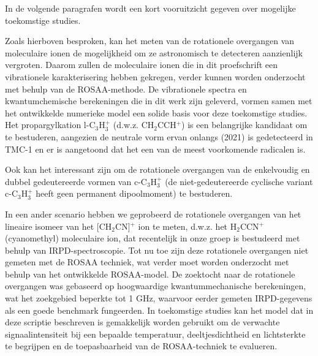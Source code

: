 {In de volgende paragrafen wordt een kort vooruitzicht gegeven over mogelijke toekomstige studies.

Zoals hierboven besproken, kan het meten van de rotationele overgangen van moleculaire ionen de mogelijkheid om ze 
astronomisch te detecteren aanzienlijk vergroten. Daarom zullen de moleculaire ionen die in dit proefschrift een 
vibrationele karakterisering hebben gekregen, verder kunnen worden onderzocht met behulp van de ROSAA-methode. De 
vibrationele spectra en kwantumchemische berekeningen die in dit werk zijn geleverd, vormen samen met het ontwikkelde 
numerieke model een solide basis voor deze toekomstige studies. Het propargylkation l-C$_3$H$_3^+$ (d.w.z. CH$_2$CCH$^+$) is een belangrijke kandidaat om te bestuderen, aangezien de neutrale vorm ervan onlangs (2021) is gedetecteerd in TMC-1 en er is aangetoond dat het een van de meest voorkomende radicalen is.

Ook kan het interessant zijn om de rotationele overgangen van de enkelvoudig en dubbel gedeutereerde vormen van c-C$_3$H$_3^+$ (de niet-gedeutereerde cyclische variant c-C$_3$H$_3^+$ heeft geen permanent dipoolmoment) te bestuderen. 

In een ander scenario hebben we geprobeerd de rotationele overgangen van het lineaire isomeer van het [CH$_2$CN]$^+$ ion te meten, d.w.z. het H$_2$CCN$^+$ (cyanomethyl) moleculaire ion, dat recentelijk in onze groep is bestudeerd met behulp van IRPD-spectroscopie. Tot nu toe zijn deze rotationele overgangen niet gemeten met de ROSAA techniek, wat verder moet worden onderzocht met behulp van het ontwikkelde ROSAA-model. De zoektocht naar de rotationele overgangen was gebaseerd op hoogwaardige kwantummechanische berekeningen, wat het zoekgebied beperkte tot 1 GHz, waarvoor eerder gemeten IRPD-gegevens als een goede benchmark fungeerden. In toekomstige studies kan het model dat in deze scriptie beschreven is gemakkelijk worden gebruikt om de verwachte signaalintensiteit bij een bepaalde temperatuur, deeltjesdichtheid en lichtsterkte te begrijpen en de toepasbaarheid van de ROSAA-techniek te evalueren.

}
